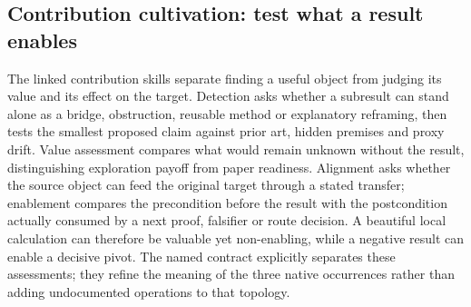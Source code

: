 

\subsection{Contribution cultivation: test what a result enables}
\label{app:granular-scientific-contribution-cultivation}
The linked contribution skills separate finding a useful object from judging
its value and its effect on the target. Detection asks whether a subresult can
stand alone as a bridge, obstruction, reusable method or explanatory reframing,
then tests the smallest proposed claim against prior art, hidden premises and
proxy drift. Value assessment compares what would remain unknown without the
result, distinguishing exploration payoff from paper readiness. Alignment asks
whether the source object can feed the original target through a stated transfer;
enablement compares the precondition before the result with the postcondition
actually consumed by a next proof, falsifier or route decision. A beautiful local
calculation can therefore be valuable yet non-enabling, while a negative result
can enable a decisive pivot. The named contract explicitly separates these
assessments; they refine the meaning of the three native occurrences rather than
adding undocumented operations to that topology.

